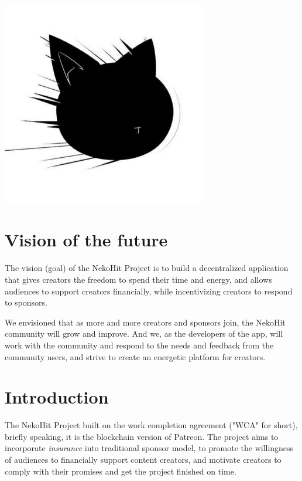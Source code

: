 \documentclass[12pt,a4paper]{article}
\begin{document}
    \tableofcontents
    \vspace*{\fill}
    \begin{center}
        \includegraphics[width=0.67\textwidth]{assets/img197}
    \end{center}
    \clearpage



    \section{Vision of the future}\label{sec:goal}

    The vision (goal) of the NekoHit Project is to build a decentralized application
    that gives creators the freedom to spend their time and energy, and allows audiences
    to support creators financially, while incentivizing creators to respond to sponsors.

    We envisioned that as more and more creators and sponsors join,
    the NekoHit community will grow and improve. And we, as the developers
    of the app, will work with the community and respond to the needs and
    feedback from the community users, and strive to create an
    energetic platform for creators.


    \section{Introduction}\label{sec:intro}

    The NekoHit Project built on the work completion agreement
    ("WCA" for short), briefly speaking, it is the blockchain version
    of Patreon. The project aims to incorporate \textit{insurance} into
    traditional sponsor model, to promote the willingness of audiences to
    financially support content creators, and motivate creators to comply
    with their promises and get the project finished on time.
\end{document}
